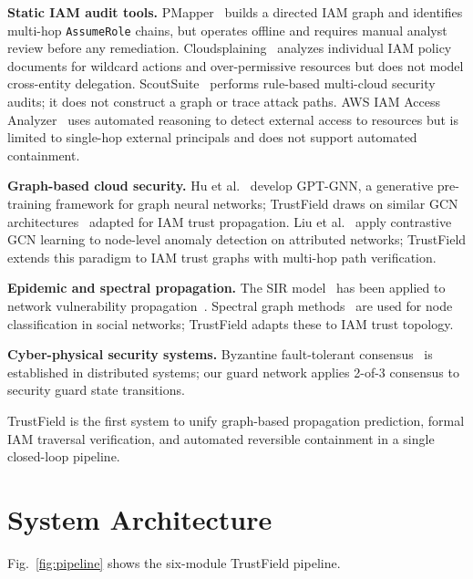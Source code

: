 \documentclass[conference,a4paper]{IEEEtran}
\begin{document}
\textbf{Static IAM audit tools.}
PMapper~\cite{pmapper} builds a directed IAM graph and identifies
multi-hop \texttt{AssumeRole} chains, but operates offline and requires
manual analyst review before any remediation.
Cloudsplaining~\cite{cloudsplaining} analyzes individual IAM policy
documents for wildcard actions and over-permissive resources but does not
model cross-entity delegation.
ScoutSuite~\cite{scoutsuite} performs rule-based multi-cloud security
audits; it does not construct a graph or trace attack paths.
AWS IAM Access Analyzer~\cite{aws_access_analyzer} uses automated
reasoning to detect external access to resources but is limited to
single-hop external principals and does not support automated containment.

\textbf{Graph-based cloud security.}
Hu et al.~\cite{hu2021} develop GPT-GNN, a generative pre-training
framework for graph neural networks; TrustField draws on similar GCN
architectures~\cite{kipf2017} adapted for IAM trust propagation.
Liu et al.~\cite{liu2022gcn} apply contrastive GCN learning to
node-level anomaly detection on attributed networks; TrustField extends
this paradigm to IAM trust graphs with multi-hop path verification.

\textbf{Epidemic and spectral propagation.}
The SIR model~\cite{kermack1927} has been applied to network
vulnerability propagation~\cite{epidemic_net2020}.
Spectral graph methods~\cite{kipf2017} are used for node classification
in social networks; TrustField adapts these to IAM trust topology.

\textbf{Cyber-physical security systems.}
Byzantine fault-tolerant consensus~\cite{pbft1999} is established in
distributed systems; our guard network applies 2-of-3 consensus to
security guard state transitions.

TrustField is the first system to unify graph-based propagation
prediction, formal IAM traversal verification, and automated reversible
containment in a single closed-loop pipeline.

\section{System Architecture}

Fig.~\ref{fig:pipeline} shows the six-module TrustField pipeline.
\end{document}
